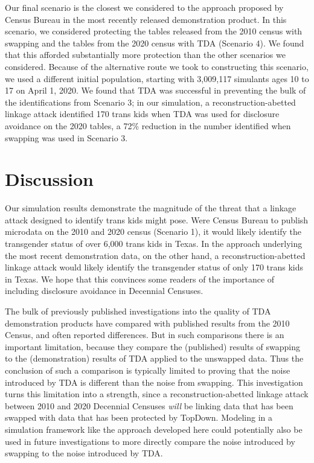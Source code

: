 \documentclass{jpc} %
\theoremstyle{plain}\newtheorem{satz}[thm]{Satz} %
\begin{document}
Our final scenario is the closest we considered to the approach proposed by Census Bureau in the most recently released demonstration product. In this scenario, we considered protecting the tables released from the 2010 census with swapping and the tables from the 2020 census with TDA (Scenario 4).  We found that this afforded substantially more protection than the other scenarios we considered.  Because of the alternative route we took to constructing this scenario, we used a different initial population, starting with 3,009,117 simulants ages 10 to 17 on April 1, 2020.  We found that TDA was successful in preventing the bulk of the identifications from Scenario 3; in our simulation, a reconstruction-abetted linkage attack identified 170 trans kids when TDA was used for disclosure avoidance on the 2020 tables, a 72\% reduction in the number identified when swapping was used in Scenario 3.

\section{Discussion}

Our simulation results demonstrate the magnitude of the threat that a linkage attack designed to identify trans kids might pose.  Were Census Bureau to publish microdata on the 2010 and 2020 census (Scenario 1), it would likely identify the transgender status of over 6,000 trans kids in Texas.  In the approach underlying the most recent demonstration data, on the other hand, a reconstruction-abetted linkage attack would likely identify the transgender status of only 170 trans kids in Texas.  We hope that this convinces some readers of the importance of including disclosure avoidance in Decennial Censuses.

The bulk of previously published investigations into the quality of TDA demonstration products have compared with published results from the 2010 Census, and often reported differences.  But in such comparisons there is an important limitation, because they compare the (published) results of swapping to the (demonstration) results of TDA applied to the unswapped data.  Thus the conclusion of such a comparison is typically limited to proving that the noise introduced by TDA is different than the noise from swapping.
This investigation turns this limitation into a strength, since a reconstruction-abetted linkage attack between 2010 and 2020 Decennial Censuses \emph{will} be linking data that has been swapped with data that has been protected by TopDown.
Modeling in a simulation framework like the approach developed here could potentially also be used in future investigations to more directly compare the noise introduced by swapping to the noise introduced by TDA.
\end{document}
